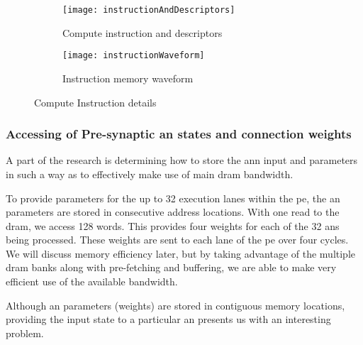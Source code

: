 \begin{figure}
\centering
  \begin{subfigure}{.95\textwidth}
    \centering
    \mbox{\texttt{[image: instructionAndDescriptors]}}
    \captionsetup{justification=centering, skip=6pt}
    \caption{Compute instruction and descriptors}
    \label{fig:Instruction and Descriptors}
  \end{subfigure}%

\bigskip

  \vspace{-35pt}
  \begin{subfigure}{1\textwidth}
    \centering
    \vspace{40pt}
    \texttt{[image: instructionWaveform]}
    \captionsetup{justification=centering, skip=10pt}
    \caption{Instruction memory waveform}
    \label{fig:Instruction memory waveform}
  \end{subfigure}%
\captionsetup{justification=centering, skip=16pt}
\caption{Compute Instruction details}
\label{fig:Instruction Details}
\end{figure}



\subsubsection{Accessing of Pre-synaptic \ac{an} states and connection weights}
\label{sec:AccessingANStates}

A part of the research is determining how to store the \ac{ann} input and parameters in such a way as to effectively make use of main \ac{dram} bandwidth. 

To provide parameters for the up to 32 execution lanes within the \ac{pe}, the \ac{an} parameters are stored in consecutive address locations. 
With one read to the \ac{dram}, we access 128 words. This provides four weights for each of the 32 \acp{an} being processed. 
These weights are sent to each lane of the \ac{pe} over four cycles. 
We will discuss memory efficiency later, but by taking advantage of the multiple \ac{dram} banks along with pre-fetching and buffering, we are able to make very efficient use of the available bandwidth.

Although \ac{an} parameters (weights) are stored in contiguous memory locations, providing the input state to a particular \ac{an} presents us with an interesting problem.

